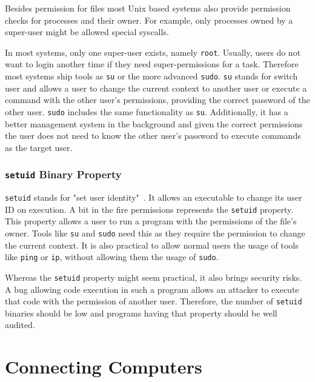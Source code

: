 Besides permission for files most Unix based systems also provide permission
checks for processes and their owner. For example, only processes owned by a
super-user might be allowed special syscalls.

In most systems, only one super-user exists, namely \texttt{root}. Usually,
users do not want to login another time if they need super-permissions for a
task. Therefore most systems ship tools as \texttt{su} or the more advanced
\texttt{sudo}. \texttt{su} stands for switch user and allows a user to change
the current context to another user or execute a command with the other user's
permissions, providing the correct password of the other user. \texttt{sudo}
includes the same functionality as \texttt{su}. Additionally, it has a better
management system in the background and given the correct permissions the user
does not need to know the other user's password to execute commands as the
target user.

\subsubsection{\texttt{setuid} Binary Property}

\texttt{setuid} stands for "set user identity"~.
It allows an executable to change its user ID on execution. A bit in the fire
permissions represents the \texttt{setuid} property. This property allows a user
to run a program with the permissions of the file's owner. Tools like
\texttt{su} and \texttt{sudo} need this as they require the permission to change
the current context. It is also practical to allow normal users the usage of
tools like \texttt{ping} or \texttt{ip}, without allowing them the usage of
\texttt{sudo}.

Whereas the \texttt{setuid} property might seem practical, it also brings
security risks. A bug allowing code execution in such a program allows an
attacker to execute that code with the permission of another user. Therefore,
the number of \texttt{setuid} binaries should be low and programs having that
property should be well audited.

\section{Connecting Computers}

